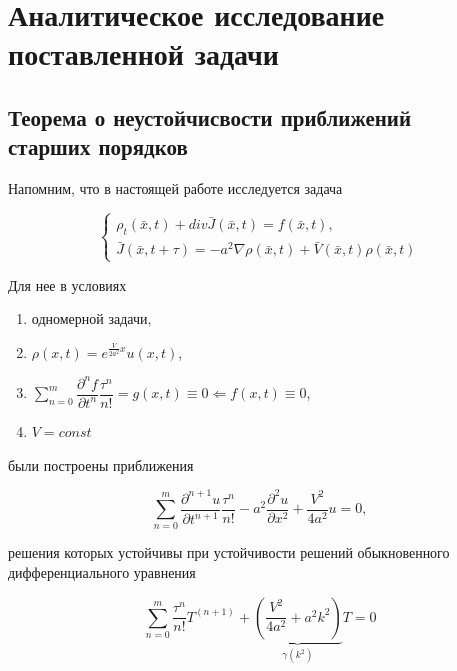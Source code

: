 \section{Аналитическое исследование\\поставленной задачи}

\subsection{Теорема о неустойчисвости приближений\\старших порядков}\label{sec:conidtions}

Напомним, что в настоящей работе исследуется задача

\begin{equation}
\left\{
\begin{aligned}
\rho_t(\bar{x},t) + div \bar{J}(\bar{x},t) = f(\bar{x},t),\\
\bar{J}(\bar{x},t+\tau) = -a^2 \nabla \rho(\bar{x},t) + \bar{V}(\bar{x},t) \rho(\bar{x},t)
\end{aligned}
\right.
\end{equation}

Для нее в условиях

\begin{enumerate}\label{eq:init-modelled}
\item одномерной задачи,
\item $\rho (x,t) = e^{\frac{V}{2a^2} x} u(x,t)$,
\item $\sum\limits_{n=0}^{m} \dfrac{\partial^n f}{\partial t^n} \dfrac{\tau^n}{n!} = g(x,t) \equiv 0 \Leftarrow f(x,t) \equiv 0$,
\item $V=const$
\end{enumerate}

были построены приближения

\begin{equation}\label{eq:transfer-modelled}
\sum\limits_{n=0}^{m} \dfrac{\partial^{n+1} u}{\partial t^{n+1}} \dfrac{\tau^n}{n!} - a^2 \dfrac{\partial^2 u}{\partial x^2} + \dfrac{V^2}{4a^2} u = 0,
\end{equation}

решения которых устойчивы при устойчивости решений обыкновенного дифференциального уравнения

\begin{equation}\label{eq:ODE-modelled}
\sum\limits_{n=0}^{m} \dfrac{\tau^n}{n!} T^{(n+1)} + \underbrace{ \left( \dfrac{V^2}{4a^2} + a^2 k^2 \right)}_{\gamma(k^2)} T = 0
\end{equation}

